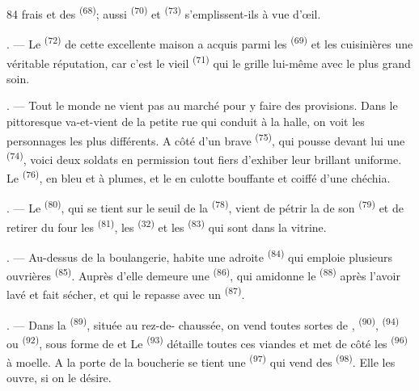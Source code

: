 \begin{VUpage}[86]{84}
\VUcontinue
frais et des  \textsuperscript{(68)}; aussi  \textsuperscript{(70)} et \nl
{} \textsuperscript{(73)} s'emplissent-ils à vue d'œil.

. --- Le  \textsuperscript{(72)} de cette excellente maison a\nl
acquis parmi les  \textsuperscript{(69)} et les cuisinières une\nl
véritable réputation, car c'est le vieil  \textsuperscript{(71)} qui\nl
le grille lui-même avec le plus grand soin.

. --- Tout le monde ne vient pas au marché pour\nl
y faire des provisions. Dans le pittoresque va-et-vient\nl
de la petite rue qui conduit à la halle, on voit les\nl
personnages les plus différents. A côté d'un brave\nl
{} \textsuperscript{(75)}, qui pousse devant lui\nl
une  \textsuperscript{(74)}, voici deux soldats en permission\nl
tout fiers d'exhiber leur brillant uniforme. Le \cc
{} \textsuperscript{(76)}, en  bleu et  à plumes, et le\nl
{} en culotte bouffante et coiffé\nl
d'une chéchia.

. --- Le  \textsuperscript{(80)}, qui se tient sur le seuil\nl
de la  \textsuperscript{(78)}, vient de pétrir la  de son\nl
{} \textsuperscript{(79)} et de retirer du four les  \textsuperscript{(81)}, les\nl
{} \textsuperscript{(32)} et les  \textsuperscript{(83)} qui sont dans la\nl
vitrine.

. --- Au-dessus de la boulangerie, habite une\nl
adroite  \textsuperscript{(84)} qui emploie plusieurs ouvrières\nl
{} \textsuperscript{(85)}. Auprès d'elle demeure une \cc
{} \textsuperscript{(86)}, qui amidonne le  \textsuperscript{(88)}\nl
après l'avoir lavé et fait sécher, et qui le repasse\nl
avec un  \textsuperscript{(87)}.

. --- Dans la  \textsuperscript{(89)}, située au rez-de-\nl
chaussée, on vend toutes sortes de , \cc
{} \textsuperscript{(90)},  \textsuperscript{(94)} ou  \textsuperscript{(92)}, sous forme de \nl
{} et  Le \cc
{} \textsuperscript{(93)} détaille toutes ces viandes et met de côté\nl
les  \textsuperscript{(96)} à moelle. A la porte de la boucherie se\nl
tient une  \textsuperscript{(97)} qui vend des  \textsuperscript{(98)}.\nl
Elle les ouvre, si on le désire.


\end{VUpage}
